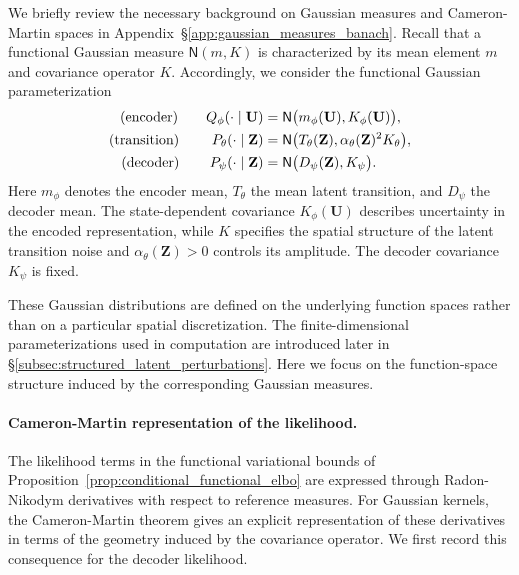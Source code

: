 \documentclass[11pt]{article}
\begin{document}
We briefly review the necessary background on Gaussian measures and Cameron-Martin spaces in Appendix~\S\ref{app:gaussian_measures_banach}. Recall that a functional Gaussian measure $\mathsf N(m,K)$ is characterized by its mean element $m$ and covariance operator $K$. Accordingly, we consider the functional Gaussian parameterization
\begin{equation*}
\begin{aligned}
    \text{(encoder)}\qquad Q_\phi(\cdot\mid\mathbf U)
    &=
    \mathsf N
    \bigl(
        m_\phi(\mathbf U),
        K_\phi(\mathbf U)
    \bigr),
    \\
    \text{(transition)}\ \qquad P_\theta(\cdot\mid\mathbf Z)
    &=
    \mathsf N
    \bigl(
        T_\theta(\mathbf Z),
        \alpha_\theta(\mathbf Z)^2 K_\theta
    \bigr),
    \\
    \text{(decoder)\,}\qquad P_\psi(\cdot\mid\mathbf Z)
    &=
    \mathsf N
    \bigl(
        D_\psi(\mathbf Z),
        K_\psi
    \bigr).
\end{aligned}
\end{equation*}
Here $m_\phi$ denotes the encoder mean, $T_\theta$ the mean latent transition, and $D_\psi$ the decoder mean. The state-dependent covariance $K_\phi(\mathbf U)$ describes uncertainty in the encoded representation, while $K$ specifies the spatial structure of the latent transition noise and $\alpha_\theta(\mathbf Z)>0$ controls its amplitude. The decoder covariance $K_\psi$ is fixed.

These Gaussian distributions are defined on the underlying function spaces rather than on a particular spatial discretization. The finite-dimensional parameterizations used in computation are introduced later in \S\ref{subsec:structured_latent_perturbations}. Here we focus on the function-space structure induced by the corresponding Gaussian measures.

\paragraph{Cameron-Martin representation of the likelihood.}
The likelihood terms in the functional variational bounds of Proposition~\ref{prop:conditional_functional_elbo} are expressed through Radon-Nikodym derivatives with respect to reference measures. For Gaussian kernels, the Cameron-Martin theorem gives an explicit representation of these derivatives in terms of the geometry induced by the covariance operator. We first record this consequence for the decoder likelihood.
\end{document}
